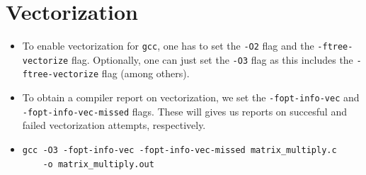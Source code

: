 \documentclass[a4paper]{article}
\begin{document}
\newpage
\section{Vectorization}

\begin{itemize}
    \setlength\itemsep{0.01em}
    \item To enable vectorization for \texttt{gcc}, one has to set the \texttt{-O2} flag and the \texttt{-ftree-vectorize} flag. Optionally, one can just set the \texttt{-O3} flag as this includes the \texttt{-ftree-vectorize} flag (among others).
    \item\sloppy To obtain a compiler report on vectorization, we set the \texttt{-fopt-info-vec} and \texttt{-fopt-info-vec-missed} flags. These will gives us reports on succesful and failed vectorization attempts, respectively.
    \item 
\begin{verbatim}
gcc -O3 -fopt-info-vec -fopt-info-vec-missed matrix_multiply.c
    -o matrix_multiply.out
\end{verbatim}


\end{itemize}
\end{document}
